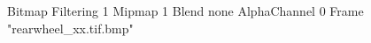 {Bitmap
	{Filtering 1}
	{Mipmap 1}
	{Blend none}
	{AlphaChannel 0}
	{Frame "rearwheel_xx.tif.bmp"}
}
